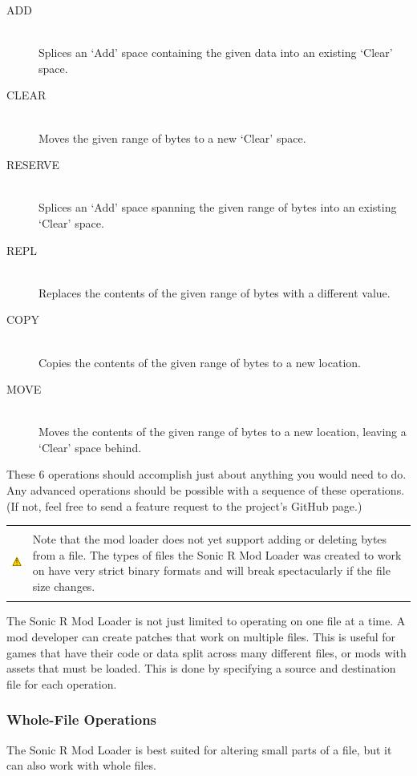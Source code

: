 \documentclass[12pt,a4paper,notitlepage]{article}
\newcommand{\warning}[1]{
    \begin{tabular}{m{1.1cm}  m{11cm}}
    &\\
    \includegraphics[width=1.1cm, height=1.1cm]{warning} & #1
    \\&\\
    \end{tabular}
}
\begin{document}
\begin{description}
\item[ADD] \hfill \\ 
    Splices an `Add' space containing the given data into an existing `Clear' space.
\item[CLEAR] \hfill \\
    Moves the given range of bytes to a new `Clear' space.
\item[RESERVE] \hfill \\
    Splices an `Add' space spanning the given range of bytes into an existing `Clear' space.
\item[REPL] \hfill \\
    Replaces the contents of the given range of bytes with a different value.
\item[COPY] \hfill \\
    Copies the contents of the given range of bytes to a new location.
\item[MOVE] \hfill \\
    Moves the contents of the given range of bytes to a new location, leaving a `Clear' space behind.
\end{description}

These 6 operations should accomplish just about anything you would need to do. Any advanced operations should be possible with a sequence of these operations. (If not, feel free to send a feature request to the project's GitHub page.)

\warning{Note that the mod loader does not yet support adding or deleting bytes from a file. The types of files the Sonic R Mod Loader was created to work on have very strict binary formats and will break spectacularly if the file size changes.}

The Sonic R Mod Loader is not just limited to operating on one file at a time. A mod developer can create patches that work on multiple files. This is useful for games that have their code or data split across many different files, or mods with assets that must be loaded. This is done by specifying a source and destination file for each operation.

\subsubsection{Whole-File Operations}
\label{subsubsec:works-patch-wholefile}
The Sonic R Mod Loader is best suited for altering small parts of a file, but it can also work with whole files. 
\end{document}
